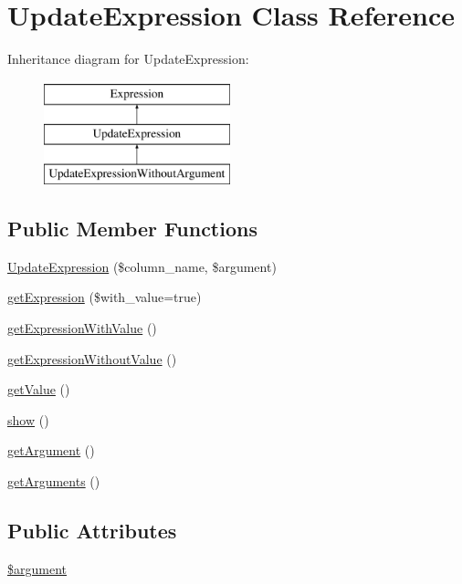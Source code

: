 \hypertarget{classUpdateExpression}{\section{Update\-Expression Class Reference}
\label{classUpdateExpression}
}
Inheritance diagram for Update\-Expression\-:\begin{figure}[H]
\begin{center}
\leavevmode
\includegraphics[height=3.000000cm]{classUpdateExpression}
\end{center}
\end{figure}
\subsection*{Public Member Functions}
\begin{DoxyCompactItemize}
\item 
\hyperlink{classUpdateExpression_a3e1cc24e9a7181ef791586f7607b86b9}{Update\-Expression} (\$column\-\_\-name, \$argument)
\item 
\hyperlink{classUpdateExpression_a1824b01ff4d35cec7d284fcd192d1c58}{get\-Expression} (\$with\-\_\-value=true)
\item 
\hyperlink{classUpdateExpression_abf5aa8ed9c023906f684c31ef735ecd6}{get\-Expression\-With\-Value} ()
\item 
\hyperlink{classUpdateExpression_a91fc65199f195dd3c5ef96a6328b7554}{get\-Expression\-Without\-Value} ()
\item 
\hyperlink{classUpdateExpression_a56d4244ba753a420fc8b6db3b10fc9f9}{get\-Value} ()
\item 
\hyperlink{classUpdateExpression_a3d3ea00a85cdf7e086139e4544e757e0}{show} ()
\item 
\hyperlink{classUpdateExpression_a86d860d80b3053bd4bcff511160aca3b}{get\-Argument} ()
\item 
\hyperlink{classUpdateExpression_a898b47f8e6a8191fd75143d402884b02}{get\-Arguments} ()
\end{DoxyCompactItemize}
\subsection*{Public Attributes}
\begin{DoxyCompactItemize}
\item 
\hyperlink{classUpdateExpression_a5ad6b27dd8458bfdd8317006ec1c5983}{\$argument}
\end{DoxyCompactItemize}


